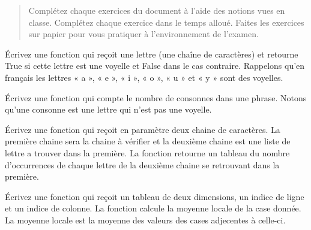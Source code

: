 \documentclass[french]{article}
\begin{document}
    \thispagestyle{plain}
    \noindent{}
    
    
    \renewcommand{\abstractname}{Instructions}
    \begin{abstract}
        Complétez chaque exercices du document à l’aide des notions vues en classe. Complétez chaque exercice dans le temps alloué. Faites les exercices sur papier pour vous pratiquer à l'environnement de l'examen.
    \end{abstract}
    \bigskip
    
    \begin{question}{6}
        Écrivez une fonction qui reçoit une lettre (une chaîne de caractères) et retourne True si cette lettre est une voyelle et False dans le cas contraire. Rappelons qu’en français les lettres « a », « e », « i », « o », « u » et « y » sont des voyelles.
    \end{question}
    \vfill
    \begin{solution}
        
    \end{solution}
    \newpage
    \begin{question}{6}
        Écrivez une fonction qui compte le nombre de consonnes dans une phrase. Notons qu’une consonne est une lettre qui n’est pas une voyelle.
    \end{question}
    \vfill
    \begin{solution}
        
    \end{solution}
    \newpage
    \begin{question}{10}
        Écrivez une fonction qui reçoit en paramètre deux chaine de caractères. La première chaine sera la chaine à vérifier et la deuxième chaine est une liste de lettre a trouver dans la première. La fonction retourne un tableau du nombre d'occurrences de chaque lettre de la deuxième chaine se retrouvant dans la première.
    \end{question}
    \vfill
    \begin{solution}
        
    \end{solution}
    \newpage
    \begin{question}{12}
        Écrivez une fonction qui reçoit un tableau de deux dimensions, un indice de ligne et un indice de colonne. La fonction calcule la moyenne locale de la case donnée. La moyenne locale est la moyenne des valeurs des cases adjecentes à celle-ci.
    \end{question}
\end{document}
